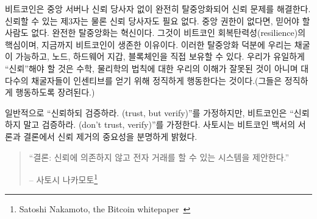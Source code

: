 \begin{comment}
	Bitcoin solves the problem of trust by being completely decentralized,
	with no central server or trusted parties. Not even trusted \textit{third}
	parties, but trusted parties, period. When there is no central
	authority, there simply \textit{is} no-one to trust. Complete decentralization
	is the innovation. It is the root of Bitcoin's resilience, the reason
	why it is still alive. Decentralization is also why we have mining,
	nodes, hardware wallets, and yes, the blockchain. The only thing you
	have to \enquote{trust} is that our understanding of mathematics and physics
	isn't totally off and that the majority of miners act honestly (which
	they are incentivized to do).
\end{comment}
비트코인은 중앙 서버나 신뢰 당사자 없이 완전히 탈중앙화되어 신뢰 문제를 해결한다.
신뢰할 수 있는 제3자는 물론 신뢰 당사자도 필요 없다.
중앙 권한이 없다면, 믿어야 할 사람도 없다.
완전한 탈중앙화는 혁신이다. 
그것이 비트코인 회복탄력성(resilience)의 핵심이며, 지금까지 비트코인이 생존한 이유이다.
이러한 탈중앙화 덕분에 우리는 채굴이 가능하고, 노드, 하드웨어 지갑, 블록체인을 직접 보유할 수 있다. 
우리가 유일하게 \enquote{신뢰}해야 할 것은 수학, 물리학의 법칙에 대한 우리의 이해가 잘못된 것이 아니며
대다수의 채굴자들이 인센티브를 얻기 위해 정직하게 행동한다는 것이다.(그들은 정직하게 행동하도록 장려된다.)

\begin{comment}
	While the regular world operates under the assumption of \textit{\enquote{trust,
			but verify,}} Bitcoin operates under the assumption of \textit{\enquote{don't
			trust, verify.}} Satoshi made the importance of removing trust very clear in
	both the introduction as well as the conclusion of the Bitcoin whitepaper.
\end{comment}
일반적으로 \enquote{신뢰하되 검증하라. (trust, but verify)}를 가정하지만,
비트코인은 \enquote{신뢰하지 말고 검증하라. (don't trust, verify)}를 가정한다.
사토시는 비트코인 백서의 서론과 결론에서 신뢰 제거의 중요성을 분명하게 밝혔다.

\begin{quotation}\begin{samepage}
		\enquote{결론: 신뢰에 의존하지 않고 전자 거래를 할 수 있는 시스템을 제안한다.}
		\begin{flushright} -- 사토시 나카모토\footnote{Satoshi Nakamoto, the Bitcoin whitepaper~\cite{whitepaper}}
\end{flushright}\end{samepage}\end{quotation}

